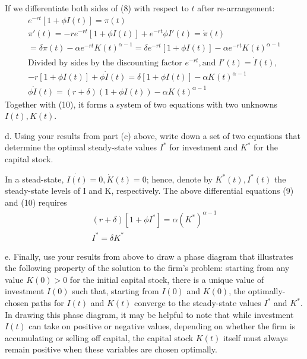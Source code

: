 \documentclass[12pt]{article}
\begin{document}
\begin{description}
If we differentiate both sides of (8) with respect to $t$ after re-arrangement: 
\begin{gather*}
    e^{-rt}[1+\phi I(t)] = \pi(t) \\ 
    \pi'(t) = -re^{-rt}[1 + \phi I(t)] + e^{-rt}\phi I'(t) = \dot{\pi}(t) \\ 
    = \delta\pi(t) - \alpha e^{-rt}K(t)^{\alpha - 1} = \delta e^{-rt}[1+\phi I(t)] - \alpha e^{-rt}K(t)^{\alpha - 1} \\
    \text{Divided by sides by the discounting factor } e^{-rt},  \text{and } I'(t) = \dot{I}(t),\\
    -r[1 + \phi I(t)] + \phi \dot{I}(t) = \delta[1 + \phi I(t)] - \alpha K(t)^{\alpha - 1} \\ 
    \phi\dot{I}(t) = (r + \delta)(1 + \phi I(t)) - \alpha K(t)^{\alpha - 1}
\end{gather*}
Together with (10), it forms a system of two equations with two unknowns $I(t), K(t)$. 
\item d. Using your results from part (c) above, write down a set of two equations that determine the optimal steady-state values $I^{*}$ for investment and $K^{*}$ for the capital stock. 

In a stead-state, $\dot{I(t)} = 0, \dot{K}(t) = 0$; hence, denote by $K^*(t), I^*(t)$ the steady-state levels of I and K, respectively. The above differential equations (9) and (10) requires 
\begin{gather*}
    (r + \delta)[1 + \phi I^*] = \alpha (K^*)^{\alpha - 1} \\ 
    I^* = \delta K^* 
\end{gather*}
\item e. Finally, use your results from above to draw a phase diagram that illustrates the following property of the solution to the firm's problem: starting from any value $K(0)>0$ for the initial capital stock, there is a unique value of investment $I(0)$ such that, starting from $I(0)$ and $K(0)$, the optimally-chosen paths for $I(t)$ and $K(t)$ converge to the steady-state values $I^{*}$ and $K^{*}$. In drawing this phase diagram, it may be helpful to note that while investment $I(t)$ can take on positive or negative values, depending on whether the firm is accumulating or selling off capital, the capital stock $K(t)$ itself must always remain positive when these variables are chosen optimally.



\end{description}
\end{document}

